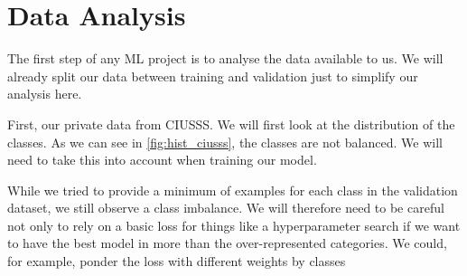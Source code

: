\documentclass[11pt]{article}
\begin{document}
\section{Data Analysis}

    The first step of any ML project is to analyse the data available to us. We will already split our data between
    training and validation just to simplify our analysis here.

    First, our private data from CIUSSS. We will first look at the distribution of the classes. As we can see in
\ref{fig:hist_ciusss}, the classes are not balanced. We will need to take this into account when training our model.


While we tried to provide a minimum of examples for each class in the validation dataset, we still observe a class imbalance.
We will therefore need to be careful not only to rely on a basic loss for things like a hyperparameter search if we want to
have the best model in more than the over-represented categories. We could, for example, ponder the loss with different weights
by classes


\end{document}

